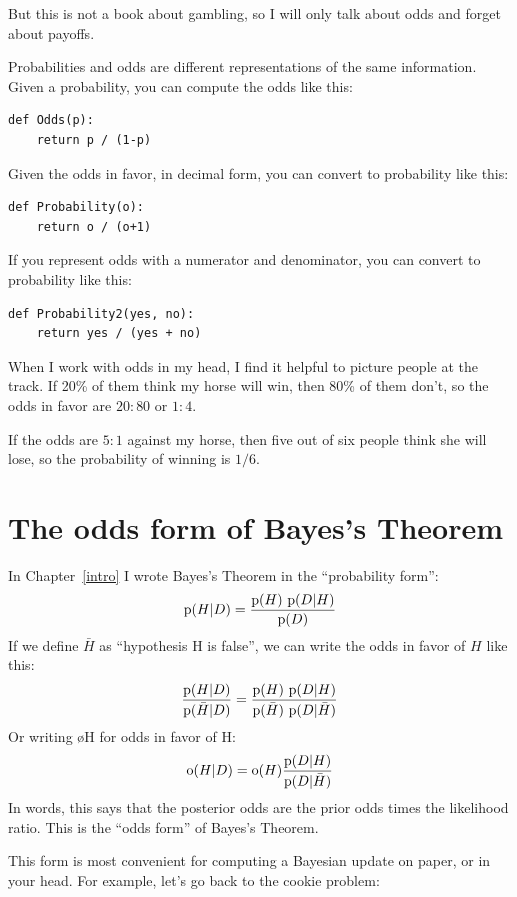 \documentclass[12pt]{book}
\begin{document}
But this is not a book about gambling, so I will only talk about odds
and forget about payoffs.

Probabilities and odds are different representations of the
same information.  Given a probability, you can compute the
odds like this:

\begin{verbatim}
def Odds(p):
    return p / (1-p)
\end{verbatim}

Given the odds in favor, in decimal form, you can convert to
probability like this:

\begin{verbatim}
def Probability(o):
    return o / (o+1)
\end{verbatim}

If you represent odds with a numerator and denominator, you
can convert to probability like this:

\begin{verbatim}
def Probability2(yes, no):
    return yes / (yes + no)
\end{verbatim}

When I work with odds in my head, I find it helpful to picture
people at the track.  If 20\% of them think my horse will win,
then 80\% of them don't, so the odds in favor are $20:80$ or
$1:4$.

If the odds are $5:1$ against my horse, then five out of six
people think she will lose, so the probability of winning
is $1/6$.

\section{The odds form of Bayes's Theorem}

In Chapter~\ref{intro} I wrote Bayes's Theorem in the ``probability
form'':
%
\[ \mathrm{p}(H|D) = \frac{\mathrm{p}(H)~\mathrm{p}(D|H)}{\mathrm{p}(D)} \]
%
If we define $\bar{H}$ as ``hypothesis H is false'', we can write the
odds in favor of $H$ like this:
%
\[ \frac{\mathrm{p}(H|D)}{\mathrm{p}(\bar{H}|D)} = \frac{\mathrm{p}(H)~\mathrm{p}(D|H)}
                                        {\mathrm{p}(\bar{H})~\mathrm{p}(D|\bar{H})} \]
%
Or writing \o{H} for odds in favor of H:
%
\[ \mathrm{o}(H|D) = \mathrm{o}(H) \frac{\mathrm{p}(D|H)}{\mathrm{p}(D|\bar{H})} \]
%
In words, this says that the posterior odds are the prior odds times
the likelihood ratio.  This is the ``odds form'' of Bayes's Theorem.

This form is most convenient for computing a Bayesian update on
paper, or in your head.  For example, let's go back to the
cookie problem:
\end{document}

